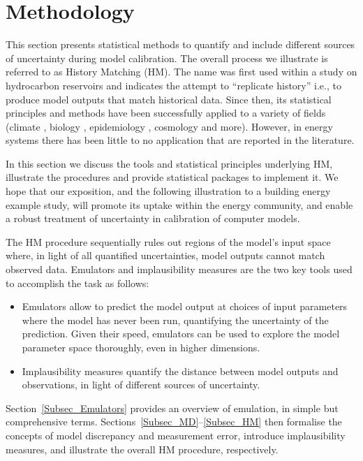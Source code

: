 \documentclass[preprint,12pt, sort&compress]{elsarticle}
\begin{document}


\section{Methodology}
\label{Sec_Methods}

This section presents statistical methods to quantify and include different sources of uncertainty during model calibration. The overall process we illustrate is referred to as History Matching (HM). The name was first used within a study on hydrocarbon reservoirs \cite{craig1997} and indicates the attempt to “replicate history” i.e., to produce model outputs that match historical data. Since then, its statistical principles and methods have been successfully applied to a variety of fields (climate \cite{domingo2020}, biology \cite{coveney2018}, epidemiology \cite{andrianakis2015}, cosmology \cite{vernon2010galaxy} and more). However, in energy systems there has been little to no application that are reported in the literature. 

In this section we discuss the tools and statistical principles underlying HM, illustrate the procedures and provide statistical packages to implement it. We hope that our exposition, and the following illustration to a building energy example study, will promote its uptake within the energy community, and enable a robust treatment of uncertainty in calibration of computer models.

The HM procedure sequentially rules out regions of the model’s input space where, in light of all quantified uncertainties, model outputs cannot match observed data. Emulators and implausibility measures are the two key tools used to accomplish the task as follows:
\begin{itemize}
\item Emulators allow to predict the model output at choices of input parameters where the model has never been run, quantifying the uncertainty of the prediction. Given their speed, emulators can be used to explore the model parameter space thoroughly, even in higher dimensions.
\item Implausibility measures quantify the distance between model outputs and observations, in light of different sources of uncertainty.
\end{itemize}

Section~\ref{Subsec_Emulators} provides an overview of emulation, in simple but comprehensive terms. Sections~\ref{Subsec_MD}--\ref{Subsec_HM} then formalise the concepts of model discrepancy and measurement error, introduce implausibility measures, and illustrate the overall HM procedure, respectively.
\end{document}
